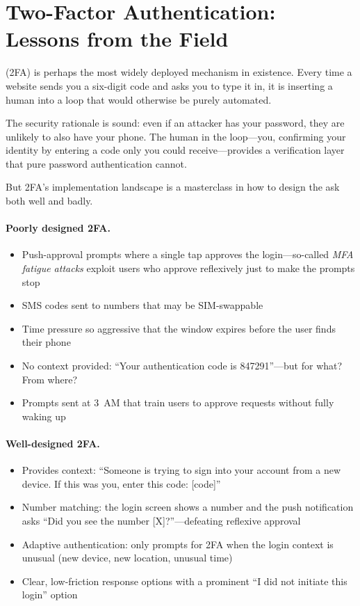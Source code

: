 \section{Two-Factor Authentication: Lessons from the Field}
\label{sec:ch05-2fa}

 (2FA) is perhaps the most widely deployed \hitl mechanism in existence. Every time a website sends you a six-digit code and asks you to type it in, it is inserting a human into a loop that would otherwise be purely automated.

The security rationale is sound: even if an attacker has your password, they are unlikely to also have your phone. The human in the loop---you, confirming your identity by entering a code only you could receive---provides a verification layer that pure password authentication cannot.

But 2FA's implementation landscape is a masterclass in how to design the ask both well and badly.

\paragraph{Poorly designed 2FA.}
\begin{itemize}
  \item Push-approval prompts where a single tap approves the login---so-called \emph{MFA fatigue attacks} exploit users who approve reflexively just to make the prompts stop
  \item SMS codes sent to numbers that may be SIM-swappable
  \item Time pressure so aggressive that the window expires before the user finds their phone
  \item No context provided: ``Your authentication code is 847291''---but for what? From where?
  \item Prompts sent at 3~AM that train users to approve requests without fully waking up
\end{itemize}

\paragraph{Well-designed 2FA.}
\begin{itemize}
  \item Provides context: ``Someone is trying to sign into your account from a new device. If this was you, enter this code: [code]''
  \item Number matching: the login screen shows a number and the push notification asks ``Did you see the number [X]?''---defeating reflexive approval
  \item Adaptive authentication: only prompts for 2FA when the login context is unusual (new device, new location, unusual time)
  \item Clear, low-friction response options with a prominent ``I did not initiate this login'' option
\end{itemize}

